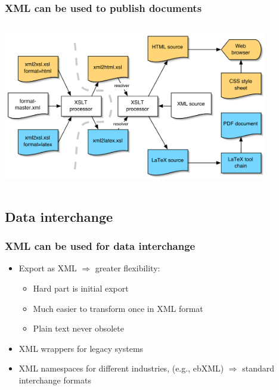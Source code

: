 \frame
{
	\frametitle{XML can be used to publish documents}
	
	\centering
	
	\begin{columns}
	
		\begin{column}{12cm}
	
			\centering
			\includegraphics[height=6.5cm,keepaspectratio]{v2_workflow}
		
		\end{column}
		
	\end{columns}
	
}




\subsection*{Data interchange}




\frame
{
	\frametitle{XML can be used for data interchange}
	
	\begin{itemize}
	
		\item Export as XML \(\Rightarrow\) greater flexibility:

		\begin{itemize}
		
			\item Hard part is initial export

			\item Much easier to transform once in XML format
			
			\item Plain text never obsolete
		
		\end{itemize}
		
		\item XML wrappers for legacy systems
		
		\item XML namespaces for different industries, (e.g., ebXML)
		\(\Rightarrow\) standard interchange formats

	\end{itemize}
	
	\note{~}
}


